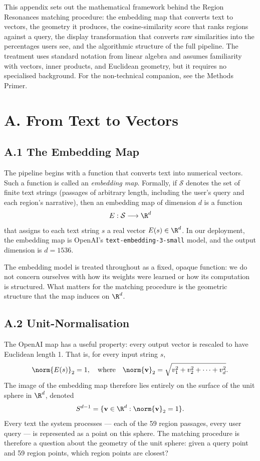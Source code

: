 \documentclass[11pt]{article}
\begin{document}

This appendix sets out the mathematical framework behind the Region Resonances matching procedure: the embedding map that converts text to vectors, the geometry it produces, the cosine-similarity score that ranks regions against a query, the display transformation that converts raw similarities into the percentages users see, and the algorithmic structure of the full pipeline. The treatment uses standard notation from linear algebra and assumes familiarity with vectors, inner products, and Euclidean geometry, but it requires no specialised background. For the non-technical companion, see the Methods Primer.

\section*{A. From Text to Vectors}

\subsection*{A.1 The Embedding Map}
The pipeline begins with a function that converts text into numerical vectors. Such a function is called an \emph{embedding map}. Formally, if $\mathcal{S}$ denotes the set of finite text strings (passages of arbitrary length, including the user's query and each region's narrative), then an embedding map of dimension $d$ is a function
\[
E : \mathcal{S} \longrightarrow \R^d
\]
that assigns to each text string $s$ a real vector $E(s) \in \R^d$. In our deployment, the embedding map is OpenAI's \texttt{text-embedding-3-small} model, and the output dimension is $d = 1536$.

The embedding model is treated throughout as a fixed, opaque function: we do not concern ourselves with how its weights were learned or how its computation is structured. What matters for the matching procedure is the geometric structure that the map induces on $\R^d$.

\subsection*{A.2 Unit-Normalisation}
The OpenAI map has a useful property: every output vector is rescaled to have Euclidean length 1. That is, for every input string $s$,
\[
\norm{E(s)}_2 = 1, \quad \text{where} \quad \norm{\mathbf{v}}_2 = \sqrt{v_1^2 + v_2^2 + \cdots + v_d^2}.
\]
The image of the embedding map therefore lies entirely on the surface of the unit sphere in $\R^d$, denoted
\[
S^{d-1} = \{ \mathbf{v} \in \R^d : \norm{\mathbf{v}}_2 = 1 \}.
\]
Every text the system processes --- each of the 59 region passages, every user query --- is represented as a point on this sphere. The matching procedure is therefore a question about the geometry of the unit sphere: given a query point and 59 region points, which region points are closest?
\end{document}
